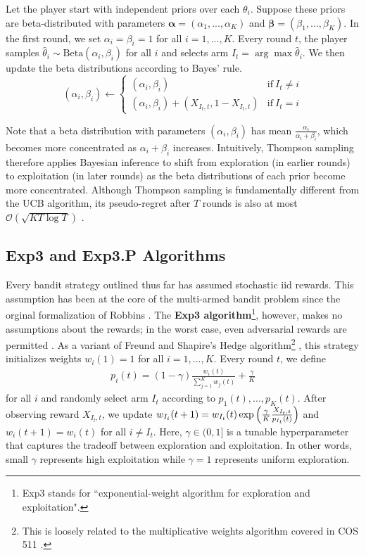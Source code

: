 \documentclass[12pt]{article}
\begin{document}
Let the player start with independent priors over each $\theta_{i}$. Suppose these priors are beta-distributed with parameters $\boldsymbol{\alpha}=(\alpha_{1}, ..., \alpha_{K})$ and $\boldsymbol{\beta}=(\beta_{1}, ..., \beta_{K})$. In the first round, we set $\alpha_{i}=\beta_{i}=1$ for all $i=1,...,K$. Every round $t$, the player samples $\hat{\theta}_{i}\sim\text{Beta}(\alpha_{i},\beta_{i})$ for all $i$ and selects arm $I_{t}=\arg\max\hat{\theta}_{i}$. We then update the beta distributions according to Bayes' rule.
\begin{equation}
(\alpha_{i}, \beta_{i})\leftarrow
\begin{cases}
(\alpha_{i},\beta_{i})&\text{if}\ I_{t}\neq i \\
(\alpha_{i},\beta_{i})+(X_{I_{t},t},1-X_{I_{t},t})&\text{if}\ I_{t}=i
\end{cases}
\end{equation}
 
Note that a beta distribution with parameters $(\alpha_{i},\beta_{i})$ has mean $\frac{\alpha_{i}}{\alpha_{i}+\beta_{i}}$, which becomes more concentrated as $\alpha_{i}+\beta_{i}$ increases. Intuitively, Thompson sampling therefore applies Bayesian inference to shift from exploration (in earlier rounds) to exploitation (in later rounds) as the beta distributions of each prior become more concentrated. Although Thompson sampling is fundamentally different from the UCB algorithm, its pseudo-regret after $T$ rounds is also at most $\mathcal{O}(\sqrt{KT\log T})$ \cite{agrawal2012}.

\subsection{Exp3 and Exp3.P Algorithms}

Every bandit strategy outlined thus far has assumed stochastic iid rewards. This assumption has been at the core of the multi-armed bandit problem since the orginal formalization of Robbins \cite{robbins1952}. The \textbf{Exp3 algorithm}\footnote{Exp3 stands for ``exponential-weight algorithm for exploration and exploitation".}, however, makes no assumptions about the rewards; in the worst case, even adversarial rewards are permitted \cite{auer2003}. As a variant of Freund and Shapire's Hedge algorithm\footnote{This is loosely related to the multiplicative weights algorithm covered in COS 511 \cite{lecture16}.} \cite{freund1997}, this strategy initializes weights $w_{i}(1)=1$ for all $i=1,...,K$. Every round $t$, we define
\begin{align}
p_{i}(t)=(1-\gamma)\frac{w_{i}(t)}{\sum_{j=1}^{K}w_{j}(t)}+\frac{\gamma}{K}
\end{align}
for all $i$ and randomly select arm $I_{t}$ according to $p_{1}(t),...,p_{K}(t)$. After observing reward $X_{I_{t},t}$, we update $w_{I_{t}}(t+1)=w_{I_{t}}(t)\exp\Big{(}{\frac{\gamma}{K}\frac{X_{I_{t},t}}{p_{I_{t}}(t)}}\Big{)}$ and $w_{i}(t+1)=w_{i}(t)$ for all $i\neq I_{t}$. Here, $\gamma\in(0,1]$ is a tunable hyperparameter that captures the tradeoff between exploration and exploitation. In other words, small $\gamma$ represents high exploitation while $\gamma=1$ represents uniform exploration.
\end{document}
